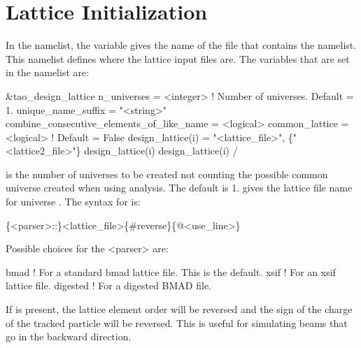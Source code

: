\section{Lattice Initialization}
\label{s:init.lat} 

In the  namelist, the  variable gives
the name of the file that contains the 
namelist. This namelist defines where the lattice input files are. The
variables that are set in the  namelist are:
\begin{example}
  &tao_design_lattice
    n_universes        = <integer>      ! Number of universes. Default = 1.
    unique_name_suffix = "<string>"
    combine_consecutive_elements_of_like_name = <logical>
    common_lattice = <logical>                        ! Default = False
    design_lattice(i) = "<lattice_file>", \{"<lattice2_file>"\}
    design_lattice(i)%
    design_lattice(i)%
  /
\end{example}

 is the number of universes to be created not counting
the possible common universe created when using  analysis. The
default is 1.   gives the lattice file name for
universe .  
The syntax for  is:
\begin{example}
  \{<parser>::\}<lattice_file>\{\#reverse\}\{@<use_line>\}
\end{example}
Possible choices for the <parser> are:
\begin{example}
  bmad      ! For a standard bmad lattice file. This is the default.
  xsif      ! For an xsif lattice file.
  digested  ! For a digested BMAD file.
\end{example}
If  is present, the lattice element order will be
reversed and the sign of the charge of the tracked particle will be
reversed. This is useful for simulating beams that go in the backward
direction.

